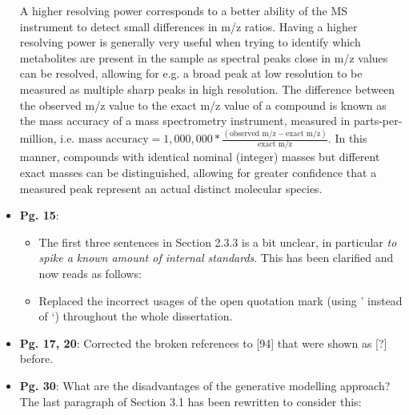 \documentclass[11pt,a4paper]{article}
\begin{document}
\begin{itemize}
{\begin{minipage}{39em}
	\newline
	\newline	
	A higher resolving power corresponds to a better ability of the MS instrument to detect small differences in m/z ratios. Having a higher resolving power is generally very useful when trying to identify which metabolites are present in the sample as spectral peaks close in m/z values can be resolved, allowing for e.g. a broad peak at low resolution to be measured as multiple sharp peaks in high resolution. The difference between the observed m/z value to the exact m/z value of a compound is known as the mass accuracy of a mass spectrometry instrument, measured in parts-per-million, i.e. $\text{mass accuracy} = 1,000,000 * \frac{(\text{observed m/z} - \text{exact m/z})}{\text{exact m/z}}$. In this manner, compounds with identical nominal (integer) masses but different exact masses can be distinguished, allowing for greater confidence that a measured peak represent an actual distinct molecular species. 
	\end{minipage}}		
	\item \textbf{Pg. 15}: 
     \begin{itemize} 
		\item The first three sentences in Section 2.3.3 is a bit unclear, in particular \emph{to spike a known amount of internal standards}. This has been clarified and now reads as follows:
	\newline
	\newline
	\newline
		\item Replaced the incorrect usages of the open quotation mark (using ' instead of `) throughout the whole dissertation.
	\end{itemize}	
	\item \textbf{Pg. 17, 20}: Corrected the broken references to [94] that were shown as [?] before.
	\item \textbf{Pg. 30}: What are the disadvantages of the generative modelling approach? The last paragraph of Section 3.1 has been rewritten to consider this:

\end{itemize}
\end{document}
